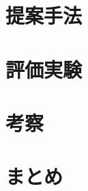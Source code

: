 \documentclass[twocolumn,jsaiac]{jarticle}
\begin{document}
\section{提案手法}
\section{評価実験}
\section{考察}
\section{まとめ}



\end{document}

